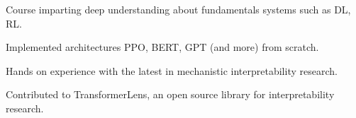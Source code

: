 \documentclass[]{deedy-resume-openfont}
\begin{document}
\begin{minipage}[t]{0.66\textwidth}
\begin{tightemize}
\item Course imparting deep understanding about fundamentals systems such as DL, RL.
\item Implemented architectures PPO, BERT, GPT (and more) from scratch.
\item Hands on experience with the latest in mechanistic interpretability research.
\item Contributed to TransformerLens, an open source library for interpretability research.
\end{tightemize}
\sectionsep

\end{minipage}
\end{document}
